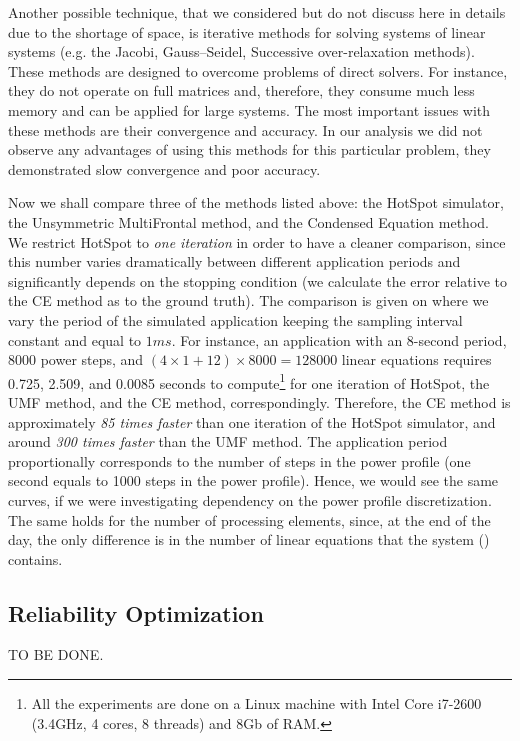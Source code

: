 Another possible technique, that we considered but do not discuss here in details due to the shortage of space, is iterative methods for solving systems of linear systems (e.g. the Jacobi, Gauss–Seidel, Successive over-relaxation methods). These methods are designed to overcome problems of direct solvers. For instance, they do not operate on full matrices and, therefore, they consume much less memory and can be applied for large systems. The most important issues with these methods are their convergence and accuracy. In our analysis we did not observe any advantages of using this methods for this particular problem, they demonstrated slow convergence and poor accuracy.

Now we shall compare three of the methods listed above: the HotSpot simulator, the Unsymmetric MultiFrontal method, and the Condensed Equation method. We restrict HotSpot to \emph{one iteration} in order to have a cleaner comparison, since this number varies dramatically between different application periods and significantly depends on the stopping condition (we calculate the error relative to the CE method as to the ground truth). The comparison is given on  where we vary the period of the simulated application keeping the sampling interval constant and equal to $1 ms$. For instance, an application with an 8-second period, 8000 power steps, and $(4 \times 1 + 12) \times 8000 = 128000$ linear equations requires 0.725, 2.509, and 0.0085 seconds to compute\footnote{All the experiments are done on a Linux machine with Intel Core i7-2600 (3.4GHz, 4 cores, 8 threads) and 8Gb of RAM.} for one iteration of HotSpot, the UMF method, and the CE method, correspondingly. Therefore, the CE method is approximately \emph{85 times faster} than one iteration of the HotSpot simulator, and around \emph{300 times faster} than the UMF method. The application period proportionally corresponds to the number of steps in the power profile (one second equals to 1000 steps in the power profile). Hence, we would see the same curves, if we were investigating dependency on the power profile discretization. The same holds for the number of processing elements, since, at the end of the day, the only difference is in the number of linear equations that the system () contains.

\subsection{Reliability Optimization}
TO BE DONE.
